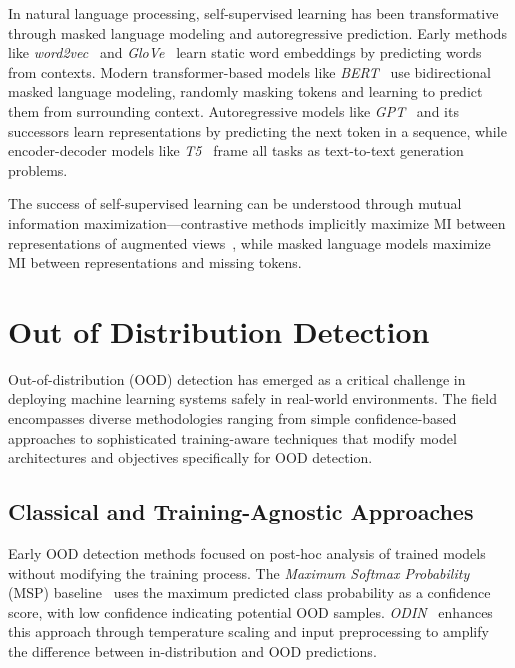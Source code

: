 \documentclass[11pt, oneside]{book}
\theoremstyle{plain}
\theoremstyle{definition}
\theoremstyle{remark}
\begin{document}
In natural language processing, self-supervised learning has been transformative through masked language modeling and autoregressive prediction. Early methods like \emph{word2vec}~\citep{mikolov2013efficient} and \emph{GloVe}~\citep{pennington2014glove} learn static word embeddings by predicting words from contexts. Modern transformer-based models like \emph{BERT}~\citep{devlin2018bert} use bidirectional masked language modeling, randomly masking tokens and learning to predict them from surrounding context. Autoregressive models like \emph{GPT}~\citep{radford2018improving} and its successors learn representations by predicting the next token in a sequence, while encoder-decoder models like \emph{T5}~\citep{raffel2020exploring} frame all tasks as text-to-text generation problems.

The success of self-supervised learning can be understood through mutual information maximization—contrastive methods implicitly maximize MI between representations of augmented views~\citep{oord2018representation,hjelm2019learning}, while masked language models maximize MI between representations and missing tokens.

\section{Out of Distribution Detection}

Out-of-distribution (OOD) detection has emerged as a critical challenge in deploying machine learning systems safely in real-world environments. The field encompasses diverse methodologies ranging from simple confidence-based approaches to sophisticated training-aware techniques that modify model architectures and objectives specifically for OOD detection.

\subsection{Classical and Training-Agnostic Approaches}

Early OOD detection methods focused on post-hoc analysis of trained models without modifying the training process. The \emph{Maximum Softmax Probability} (MSP) baseline~\citep{hendrycks2016baseline} uses the maximum predicted class probability as a confidence score, with low confidence indicating potential OOD samples. \emph{ODIN}~\citep{liang2017enhancing} enhances this approach through temperature scaling and input preprocessing to amplify the difference between in-distribution and OOD predictions.
\end{document}
